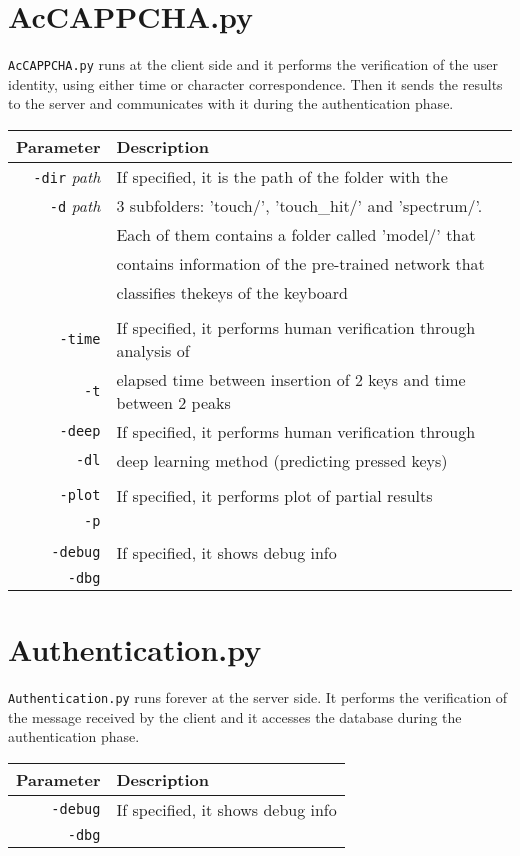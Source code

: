 \section{AcCAPPCHA.py}
\texttt{AcCAPPCHA.py} runs at the client side and it performs the verification of the user identity, using either time or character correspondence. Then it sends the results to the server and communicates with it during the authentication phase.

{\footnotesize
\begin{longtable}{rl}
\hline
\textbf{Parameter} & \textbf{Description}\\
\hline
\texttt{-dir} \textit{path} & If specified, it is the path of the folder with the\\
\texttt{-d} \textit{path} & 3 subfolders: 'touch/', 'touch\_hit/' and 'spectrum/'.\\
& Each of them contains a folder called 'model/' that\\
& contains information of the pre-trained network that\\
& classifies thekeys of the keyboard\\
&\\
\texttt{-time} &If specified, it performs human verification through analysis of\\
\texttt{-t} & elapsed time between insertion of 2 keys and time between 2 peaks\\
\texttt{-deep} & If specified, it performs human verification through\\
\texttt{-dl} & deep learning method (predicting pressed keys)\\
&\\
\texttt{-plot} & If specified, it performs plot of partial results\\
\texttt{-p} &\\
&\\
\texttt{-debug} & If specified, it shows debug info\\
\texttt{-dbg} & \\
\hline
\end{longtable}}

\section{Authentication.py}
\texttt{Authentication.py} runs forever at the server side. It performs the verification of the message received by the client and it accesses the database during the authentication phase.
\begin{table}[h]
\centering\footnotesize
\begin{tabular}{rl}
\hline
\textbf{Parameter} & \textbf{Description}\\
\hline
\texttt{-debug} & If specified, it shows debug info\\
\texttt{-dbg} &\\
\hline
\end{tabular}
\end{table}